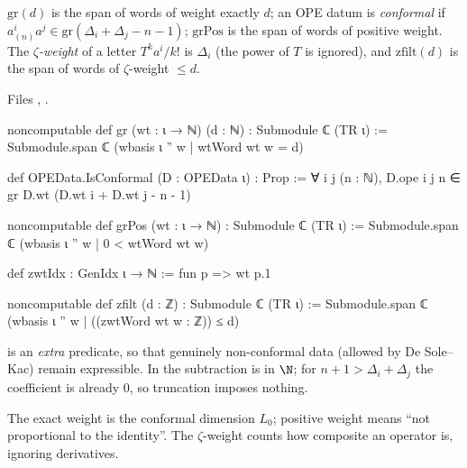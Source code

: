 \begin{definition}\label{l11:def:gr}
$\mathrm{gr}(d)$ is the span of words of weight exactly $d$; an OPE datum is \emph{conformal} if $a^i_{(n)}a^j\in\mathrm{gr}(\Delta_i+\Delta_j-n-1)$;
$\mathrm{grPos}$ is the span of words of positive weight. The \emph{$\zeta$-weight} of a letter $T^ka^i/k!$ is $\Delta_i$ (the power of $T$ is
ignored), and $\mathrm{zfilt}(d)$ is the span of words of $\zeta$-weight $\le d$.
\end{definition}
\noindent Files , .
\begin{leancode}
noncomputable def gr (wt : ι → ℕ) (d : ℕ) : Submodule ℂ (TR ι) :=
  Submodule.span ℂ (wbasis ι '' {w | wtWord wt w = d})

def OPEData.IsConformal (D : OPEData ι) : Prop :=
  ∀ i j (n : ℕ), D.ope i j n ∈ gr D.wt (D.wt i + D.wt j - n - 1)

noncomputable def grPos (wt : ι → ℕ) : Submodule ℂ (TR ι) :=
  Submodule.span ℂ (wbasis ι '' {w | 0 < wtWord wt w})

def zwtIdx : GenIdx ι → ℕ := fun p => wt p.1

noncomputable def zfilt (d : ℤ) : Submodule ℂ (TR ι) :=
  Submodule.span ℂ (wbasis ι '' {w | ((zwtWord wt w : ℤ)) ≤ d})
\end{leancode}

\begin{dictionary}
 is an \emph{extra} predicate, so that genuinely non-conformal data (allowed by De Sole--Kac) remain expressible.
In  the subtraction is in $\N$; for $n+1>\Delta_i+\Delta_j$ the coefficient is already $0$, so truncation imposes nothing.
\end{dictionary}

\begin{physics}
The exact weight is the conformal dimension $L_0$; positive weight means ``not proportional to the identity''. The $\zeta$-weight counts
how composite an operator is, ignoring derivatives.
\end{physics}


